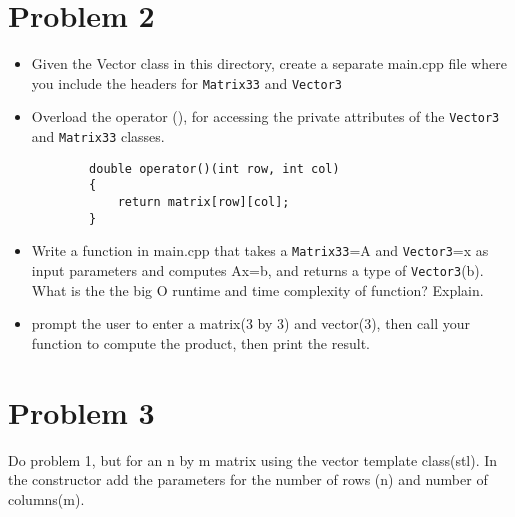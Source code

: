 \documentclass[a4paper]{article}
\begin{document}
\section*{Problem 2}
\begin{itemize}
    \item Given the Vector class in this directory, create a separate main.cpp file where you include the headers for \texttt{Matrix33} and \texttt{Vector3}
    \item Overload the operator (), for accessing the private attributes of the \texttt{Vector3} and \texttt{Matrix33} classes.
    \begin{verbatim}
        double operator()(int row, int col)
        {
            return matrix[row][col];
        }
    \end{verbatim} 
    \item Write a function in main.cpp that takes a  \texttt{Matrix33}=A and \texttt{Vector3}=x as input parameters
          and computes Ax=b, and returns a type of \texttt{Vector3}(b). What is the the big O runtime and time complexity of function? Explain. 
    \item prompt the user to enter a matrix(3 by 3) and vector(3), then call your function to compute the product, then print the result.
\end{itemize}
\newpage
 

\section*{Problem 3}
Do problem 1, but for an n by m matrix using the vector template class(stl). 
In the constructor add the parameters for the number of rows (n) and number of columns(m).
\end{document}
